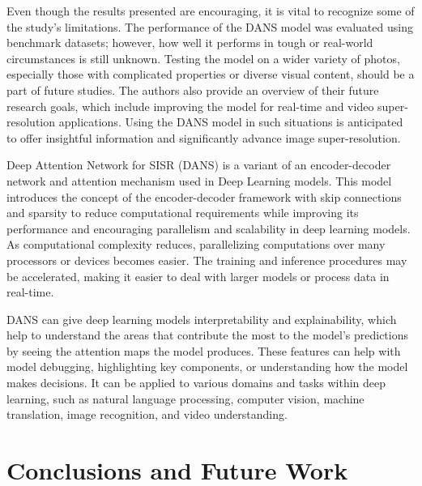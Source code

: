 \documentclass{ieeeaccess}
\begin{document}
Even though the results presented are encouraging, it is vital to recognize some of the study's limitations. The performance of the DANS model was evaluated using benchmark datasets; however, how well it performs in tough or real-world circumstances is still unknown. Testing the model on a wider variety of photos, especially those with complicated properties or diverse visual content, should be a part of future studies. The authors also provide an overview of their future research goals, which include improving the model for real-time and video super-resolution applications. Using the DANS model in such situations is anticipated to offer insightful information and significantly advance image super-resolution.

Deep Attention Network for SISR (DANS) is a variant of an encoder-decoder network and attention mechanism used in Deep Learning models. This model introduces the concept of the encoder-decoder framework with skip connections and sparsity to reduce computational requirements while improving its performance and encouraging parallelism and scalability in deep learning models. As computational complexity reduces, parallelizing computations over many processors or devices becomes easier. The training and inference procedures may be accelerated, making it easier to deal with larger models or process data in real-time.

DANS can give deep learning models interpretability and explainability, which help to understand the areas that contribute the most to the model's predictions by seeing the attention maps the model produces. These features can help with model debugging, highlighting key components, or understanding how the model makes decisions. It can be applied to various domains and tasks within deep learning, such as natural language processing, computer vision, machine translation, image recognition, and video understanding.


\section{Conclusions and Future Work}
\end{document}
